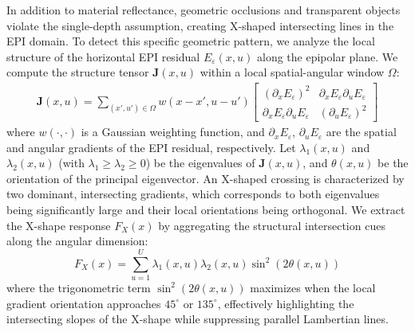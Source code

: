 In addition to material reflectance, geometric occlusions and transparent objects violate the single-depth assumption, creating X-shaped intersecting lines in the EPI domain. To detect this specific geometric pattern, we analyze the local structure of the horizontal EPI residual $E_{\varepsilon}(x, u)$ along the epipolar plane. We compute the structure tensor $\mathbf{J}(x,u)$ within a local spatial-angular window $\Omega$:
\begin{align}
\mathbf{J}(x,u) = \sum_{(x',u') \in \Omega} w(x-x', u-u') \begin{bmatrix} (\partial_x E_{\varepsilon})^2 & \partial_x E_{\varepsilon} \partial_u E_{\varepsilon} \\ \partial_x E_{\varepsilon} \partial_u E_{\varepsilon} & (\partial_u E_{\varepsilon})^2 \end{bmatrix}
\end{align}
where $w(\cdot, \cdot)$ is a Gaussian weighting function, and $\partial_x E_{\varepsilon}$, $\partial_u E_{\varepsilon}$ are the spatial and angular gradients of the EPI residual, respectively. Let $\lambda_1(x,u)$ and $\lambda_2(x,u)$ (with $\lambda_1 \ge \lambda_2 \ge 0$) be the eigenvalues of $\mathbf{J}(x,u)$, and $\theta(x,u)$ be the orientation of the principal eigenvector. An X-shaped crossing is characterized by two dominant, intersecting gradients, which corresponds to both eigenvalues being significantly large and their local orientations being orthogonal. We extract the X-shape response $F_{X}(x)$ by aggregating the structural intersection cues along the angular dimension:
\begin{equation}
\label{eq:eq14}
F_{X}(x) = \sum_{u=1}^{U} \lambda_1(x,u) \lambda_2(x,u) \sin^2(2\theta(x,u))
\end{equation}
where the trigonometric term $\sin^2(2\theta(x,u))$ maximizes when the local gradient orientation approaches $45^\circ$ or $135^\circ$, effectively highlighting the intersecting slopes of the X-shape while suppressing parallel Lambertian lines.

